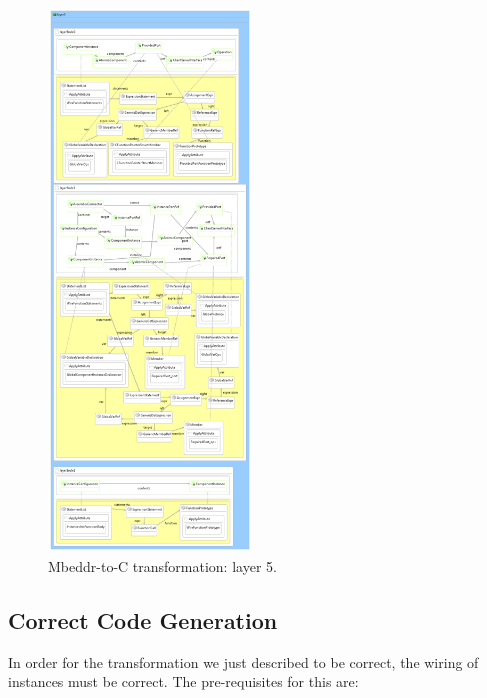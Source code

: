 \begin{figure}
\begin{center}
  \includegraphics[width=0.48\textwidth]{figures/mbeddr/mbeddr2C_optimized_layer_5}
  \caption{Mbeddr-to-C transformation: layer 5.}
  \label{fig:mb2c_layer_5}
\end{center}
\end{figure}


\subsection{Correct Code Generation}


In order for the transformation we just described to be correct, the wiring of
instances must be correct. The pre-requisites for this are:

